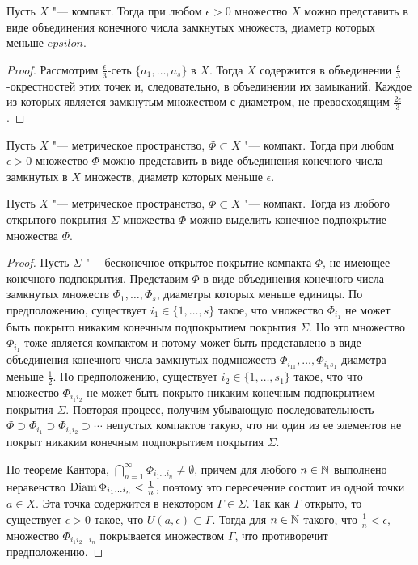\begin{proposition}
    Пусть $X$ "--- компакт. Тогда при любом $\epsilon > 0$ множество $X$ можно представить в виде объединения конечного числа замкнутых множеств, диаметр которых меньше $epsilon$.
\end{proposition}

\begin{proof}
    Рассмотрим $\frac \epsilon 3$-сеть $\lbrace a_1,\ldots, a_s\rbrace$ в $X$. Тогда $X$ содержится в объединении $\frac \epsilon 3$-окрестностей этих точек и, следовательно, в объединении их замыканий. Каждое из которых является замкнутым множеством с диаметром, не превосходящим $\frac{2\epsilon}{3}$.
\end{proof}

\begin{corollary}
    Пусть $X$ "--- метрическое пространство, $\Phi \subset X$ "--- компакт. Тогда при любом $\epsilon > 0$ множество $\Phi$ можно представить в виде объединения конечного числа замкнутых в $X$ множеств, диаметр которых меньше $\epsilon$.
\end{corollary}

\begin{theorem}
    Пусть $X$ "--- метрическое пространство, $\Phi \subset X$ "--- компакт. Тогда из любого открытого покрытия $\Sigma$ множества $\Phi$ можно выделить конечное подпокрытие множества $\Phi$.
\end{theorem}

\begin{proof}
    Пусть $\Sigma$ "--- бесконечное открытое покрытие компакта $\Phi$, не имеющее конечного подпокрытия. Представим $\Phi$ в виде объединения конечного числа замкнутых множеств $\Phi_1, \ldots, \Phi_s$, диаметры которых меньше единицы. По предположению, существует $i_1 \in \{1, \dotsc, s\}$ такое, что множество $\Phi_{i_1}$ не может быть покрыто никаким конечным подпокрытием покрытия $\Sigma$. Но это множество $\Phi_{i_1}$ тоже является компактом и потому может быть представлено в виде объединения конечного числа замкнутых подмножеств $\Phi_{i_11}, \ldots, \Phi_{i_1s_1}$ диаметра меньше $\frac 12$. По предположению, существует $i_2 \in \{1, \dotsc, s_1\}$ такое, что что множество $\Phi_{i_1i_2}$ не может быть покрыто никаким конечным подпокрытием покрытия $\Sigma$. Повторая процесс, получим убывающую последовательность $\Phi\supset \Phi_{i_1}\supset\Phi_{i_1i_2}\supset \dotsb$ непустых компактов такую, что ни один из ее элементов не покрыт никаким конечным подпокрытием покрытия $\Sigma$.
    
    По теореме Кантора, $\bigcap_{n = 1}^\infty \Phi_{i_1\ldots i_n} \ne \emptyset$, причем для любого $n \in \mathbb{N}$ выполнено неравенство $\operatorname{Diam} \Phi_{i_1\ldots i_n} < \frac 1n$, поэтому это пересечение состоит из одной точки $a \in X$. Эта точка содержится в некотором $\Gamma \in \Sigma$. Так как $\Gamma$ открыто, то существует $\epsilon > 0$ такое, что $U(a,\epsilon) \subset \Gamma$. Тогда для $n \in \mathbb{N}$ такого, что $\frac 1n < \epsilon$, множество $\Phi_{i_1i_2\ldots i_n}$ покрывается множеством $\Gamma$, что противоречит предположению.
\end{proof}

